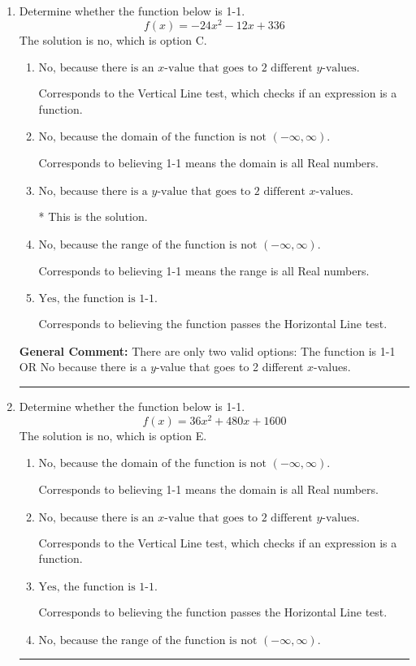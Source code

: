 \documentclass{extbook}[14pt]
\newcommand{\litem}[1]{\item #1

\rule{\textwidth}{0.4pt}}
\begin{document}
\begin{enumerate}\litem{
Determine whether the function below is 1-1.
\[ f(x) = -24 x^2 - 12 x + 336 \]The solution is \( \text{no} \), which is option C.\begin{enumerate}[label=\Alph*.]
\item \( \text{No, because there is an $x$-value that goes to 2 different $y$-values.} \)

Corresponds to the Vertical Line test, which checks if an expression is a function.
\item \( \text{No, because the domain of the function is not $(-\infty, \infty)$.} \)

Corresponds to believing 1-1 means the domain is all Real numbers.
\item \( \text{No, because there is a $y$-value that goes to 2 different $x$-values.} \)

* This is the solution.
\item \( \text{No, because the range of the function is not $(-\infty, \infty)$.} \)

Corresponds to believing 1-1 means the range is all Real numbers.
\item \( \text{Yes, the function is 1-1.} \)

Corresponds to believing the function passes the Horizontal Line test.
\end{enumerate}

\textbf{General Comment:} There are only two valid options: The function is 1-1 OR No because there is a $y$-value that goes to 2 different $x$-values.
}
\litem{
Determine whether the function below is 1-1.
\[ f(x) = 36 x^2 + 480 x + 1600 \]The solution is \( \text{no} \), which is option E.\begin{enumerate}[label=\Alph*.]
\item \( \text{No, because the domain of the function is not $(-\infty, \infty)$.} \)

Corresponds to believing 1-1 means the domain is all Real numbers.
\item \( \text{No, because there is an $x$-value that goes to 2 different $y$-values.} \)

Corresponds to the Vertical Line test, which checks if an expression is a function.
\item \( \text{Yes, the function is 1-1.} \)

Corresponds to believing the function passes the Horizontal Line test.
\item \( \text{No, because the range of the function is not $(-\infty, \infty)$.} \)


\end{enumerate}}
\end{enumerate}
\end{document}
